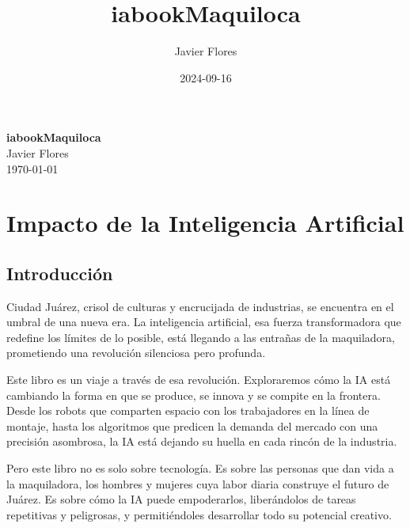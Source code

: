 \documentclass[
  10pt,
  letterpaper,
]{book}
\title{iabookMaquiloca}
\author{Javier Flores}
\date{2024-09-16}
\renewcommand*\contentsname{Table of contents}
\newcommand\contentsname{Table of contents}
\begin{document}
\frontmatter
\maketitle

\begin{titlepage}
\centering
\vspace*{5cm} %
{\Huge \textbf{iabookMaquiloca}}\\[1cm]
{\Large Javier Flores}\\[2cm]
{\large \today}\\[5cm]
\end{titlepage}

\renewcommand*\contentsname{Table of contents}
{
\hypersetup{linkcolor=}
\setcounter{tocdepth}{1}
\tableofcontents
}

\mainmatter
{}

\chapter*{Impacto de la Inteligencia
Artificial}\label{impacto-de-la-inteligencia-artificial}


\section*{Introducción}\label{introducciuxf3n}


Ciudad Juárez, crisol de culturas y encrucijada de industrias, se
encuentra en el umbral de una nueva era. La inteligencia artificial, esa
fuerza transformadora que redefine los límites de lo posible, está
llegando a las entrañas de la maquiladora, prometiendo una revolución
silenciosa pero profunda.

Este libro es un viaje a través de esa revolución. Exploraremos cómo la
IA está cambiando la forma en que se produce, se innova y se compite en
la frontera. Desde los robots que comparten espacio con los trabajadores
en la línea de montaje, hasta los algoritmos que predicen la demanda del
mercado con una precisión asombrosa, la IA está dejando su huella en
cada rincón de la industria.

Pero este libro no es solo sobre tecnología. Es sobre las personas que
dan vida a la maquiladora, los hombres y mujeres cuya labor diaria
construye el futuro de Juárez. Es sobre cómo la IA puede empoderarlos,
liberándolos de tareas repetitivas y peligrosas, y permitiéndoles
desarrollar todo su potencial creativo.
\end{document}
